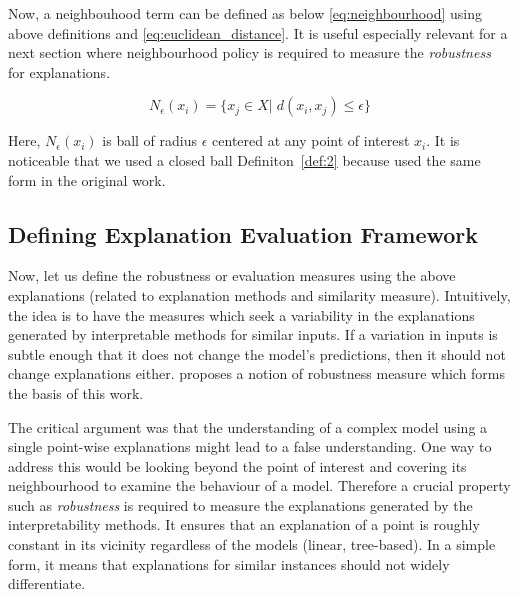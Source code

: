 \documentclass[english]{tktltiki2}
\theoremstyle{definition}
\theoremstyle{remark}
\newcommand{\onespace}{\;}
\begin{document}
Now, a neighbouhood term can be defined as below \eqref{eq:neighbourhood} using above definitions and \eqref{eq:euclidean_distance}. It is useful especially relevant for a next section where neighbourhood policy is required to measure the \textit{robustness} for explanations. 

\begin{equation}\label{eq:neighbourhood}
N_{\epsilon}(x_i) = \{x_j \in X| \onespace d(x_i, x_j) \leq \epsilon\}
\end{equation}  

Here, $N_{\epsilon}(x_{i})$ is ball of radius $\epsilon$ centered at any point of interest $x_i$. It is noticeable that we used a closed ball Definiton~\ref{def:2} because \citep{alvarez2018robustness} used the same form in the original work.

\subsection{Defining Explanation Evaluation Framework}\label{sec:defining_explanation_evaluation_framework} %

Now, let us define the robustness or evaluation measures using the above explanations (related to explanation methods and similarity measure). Intuitively, the idea is to have the measures which seek a variability in the explanations generated by interpretable methods for similar inputs. If a variation in inputs is subtle enough that it does not change the model's predictions, then it should not change explanations either. \citet{alvarez2018robustness} proposes a notion of robustness measure which forms the basis of this work.

The critical argument was that the understanding of a complex model using a single point-wise explanations might lead to a false understanding. One way to address this would be looking beyond the point of interest and covering its neighbourhood to examine the behaviour of a model. Therefore a crucial property such as \textit{robustness} is required to measure the explanations generated by the interpretability methods. It ensures that an explanation of a point is roughly constant in its vicinity regardless of the models (linear, tree-based).  In a simple form, it means that explanations for similar instances should not widely differentiate.
\end{document}
